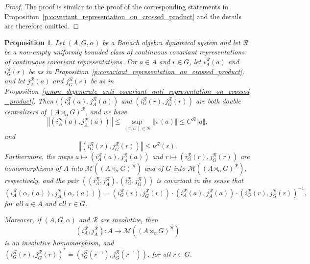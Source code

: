 \documentclass{amsart}
\theoremstyle{plain}
\newtheorem{prop}[theorem]{Proposition}
\theoremstyle{definition}
\numberwithin{equation}{section}
\begin{document}
\begin{proof}
The proof is similar to the proof of the corresponding statements in Proposition~\ref{p:covariant_representation_on_crossed_product} and the details are therefore omitted.
\end{proof}

\begin{prop}\label{p:covariant_homomorphisms_into_double_centralizer_algebra}
Let ${(A,G,\alpha)}$ be a Banach algebra dynamical system and let ${\mathcal R}$ be a non-empty uniformly bounded class of continuous covariant representations of continuous covariant representations. For $a \in A$ and $r \in G$, let $i_A^{\mathcal R}(a)$ and $i_G^{\mathcal R}(r)$ be as in Proposition~\ref{p:covariant_representation_on_crossed_product}, and let $j_A^{\mathcal R}(a)$ and $j_G^{\mathcal R}(r)$ be as in Proposition~\ref{p:non_degenerate_anti_covariant_anti_representation_on_crossed_product}. Then $((i_A^{\mathcal R}(a), j_A^{\mathcal R}(a))$ and $(i_G^{\mathcal R}(r), j_G^{\mathcal R}(r))$ are both double centralizers of ${(A {\rtimes}_\alpha G)^\mathcal{R}}$, and we have
\[
 {\left\Vert {(i_A^{\mathcal R}(a), j_A^{\mathcal R}(a))} \right\Vert} \leq \sup_{{(\pi,U)} \in {\mathcal R}} {\left\Vert {\pi(a)} \right\Vert} \leq {{C^{\mathcal R}}}{\left\Vert {a} \right\Vert},
\]
and
\[
 {\left\Vert {(i_G^{\mathcal R}(r), j_G^{\mathcal R}(r))} \right\Vert} \leq {\nu^{\mathcal R}}(r).
\]
Furthermore, the maps $a \mapsto (i_A^{\mathcal R}(a), j_A^{\mathcal R}(a))$ and $r \mapsto (i_G^{\mathcal R}(r), j_G^{\mathcal R}(r))$ are homomorphisms of $A$ into $\mathcal M ({(A {\rtimes}_\alpha G)^\mathcal{R}})$ and of $G$ into $\mathcal M ({(A {\rtimes}_\alpha G)^\mathcal{R}})$, respectively, and
the pair $((i_A^{\mathcal R}, j_A^{\mathcal R}), (i_G^{\mathcal R}, j_G^{\mathcal R}))$ is covariant in the sense that
\[ (i_A^{\mathcal R}(\alpha_r(a)), j_A^{\mathcal R}(\alpha_r(a)) ) = (i_G^{\mathcal R}(r), j_G^{\mathcal R}(r))\cdot (i_A^{\mathcal R}(a), j_A^{\mathcal R}(a))\cdot (i_G^{\mathcal R}(r), j_G^{\mathcal R}(r))^{-1}, \]
for all $a \in A$ and all $r \in G$.

Moreover, if ${(A,G,\alpha)}$ and ${\mathcal R}$ are involutive, then
\[ (i_A^{\mathcal R}, j_A^{\mathcal R}): A \to \mathcal M({(A {\rtimes}_\alpha G)^\mathcal{R}}) \]
is an involutive homomorphism, and $(i_G^{\mathcal R}(r), j_G^{\mathcal R}(r))^* = (i_G^{\mathcal R}(r^{-1}), j_G^{\mathcal R}(r^{-1}))$, for all $r\in G$.
\end{prop}
\end{document}
